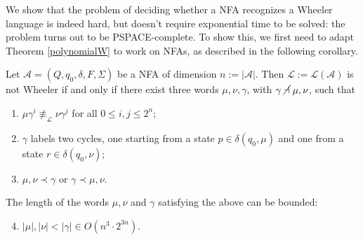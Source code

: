\documentclass[runningheads]{llncs}
\newcommand{\ndashv}{\;\cancel\dashv\;}
\newcommand{\la}[1]{\mathcal L(\mathcal #1)}
\begin{document}
We show that the problem of deciding whether a NFA recognizes a Wheeler language is indeed hard, but doesn't require exponential time to be solved: the problem turns out to be PSPACE-complete. To show this, we first need to adapt Theorem \ref{polynomialW} to work on NFAs, as described in the following corollary.

\begin{corollary}
\label{nfa length}
Let $\mathcal A = (Q, q_0, \delta, F, \Sigma)$ be a NFA of dimension $n := |\mathcal A|$. Then $\mathcal L := \la A$ is not Wheeler if and only if there exist three words $\mu, \nu, \gamma$, with $\gamma \ndashv \mu,\nu$, such that
\begin{enumerate}
    \item $\mu\gamma^i \not\equiv_{\mathcal L} \nu\gamma^j$ for all $0 \le i,j \le 2^n$; 
    \item $\gamma$ labels two cycles, one starting from a state $p \in \delta(q_0,\mu)$ and one from a state $r \in \delta(q_0,\nu)$;
    \item $\mu, \nu \prec \gamma$ or $\gamma \prec \mu, \nu$.
\end{enumerate}
The length of the words $\mu, \nu$ and $\gamma$ satisfying the above can be bounded: 
\begin{enumerate}
\setcounter{enumi}{3}
    \item $|\mu|, |\nu| < |\gamma| \in O(n^3\cdot2^{3n})$.
\end{enumerate}
\end{corollary}
\end{document}
